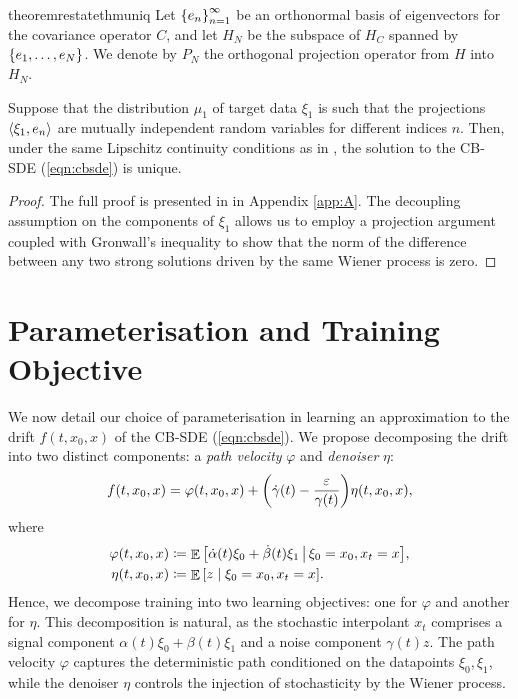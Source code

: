 \begin{restatable}{theorem}{restatethmuniq}\label{thm:uniq}
  Let \(\qty{e_{n}}_{n=1}^{\infty}\) be an orthonormal basis of eigenvectors for the covariance operator \(C\), and let \(H_{N}\) be the subspace of \(H_{C}\) spanned by \(\qty{e_{1}, \ldots, e_{N}}\). We denote by \(P_{N}\) the orthogonal projection operator from \(H\) into \(H_{N}\).

  Suppose that the distribution \(\mu_{1}\) of target data \(\xi_{1}\) is such that the projections \(\ev{\xi_{1}, e_{n}}\) are mutually independent random variables for different indices \(n\). Then, under the same Lipschitz continuity conditions as in , the solution to the CB-SDE (\ref{eqn:cbsde}) is unique.
\end{restatable}
\begin{proof}
  The full proof is presented in  in Appendix \ref{app:A}. The decoupling assumption on the components of \(\xi_{1}\) allows us to employ a projection argument coupled with Gronwall's inequality to show that the norm of the difference between any two strong solutions driven by the same Wiener process is zero.
\end{proof}


\section{Parameterisation and Training Objective}
We now detail our choice of parameterisation in learning an approximation to the drift \(f(t,x_{0}, x)\)  of the CB-SDE (\ref{eqn:cbsde}). We propose decomposing the drift into two distinct components: a \textit{path velocity} \(\varphi\) and \textit{denoiser} \(\eta\):
\begin{equation}
  f(t, x_{0}, x) = \varphi(t, x_{0}, x) + \qty(\dot{\gamma}(t) - \frac{\varepsilon}{\gamma(t)}) \eta(t,  x_{0}, x), \label{eqn:driftgoodparam}
\end{equation}
where
\begin{align*}
  \varphi(t, x_{0}, x) &\coloneqq \mathop{\mathbb{E}}\qty[\dot{\alpha}(t) \xi_{0} + \dot{\beta}(t)\xi_{1} \,\big|\, \xi_{0} = x_{0}, x_{t} = x], \\
  \eta(t, x_{0}, x) &\coloneqq \mathop{\mathbb{E}}\qty[z \mid \xi_{0} = x_{0}, x_{t} = x].
\end{align*}
Hence, we decompose training into two learning objectives: one for \(\varphi\) and another for \(\eta\). This decomposition is natural, as the stochastic interpolant \(x_{t}\) comprises a  signal component \(\alpha(t) \xi_{0} + \beta(t) \xi_{1}\) and a noise component \(\gamma(t) z\). The path velocity \(\varphi\) captures the deterministic path conditioned on the datapoints \(\xi_{0}, \xi_{1}\), while the denoiser \(\eta\) controls the injection of stochasticity by the Wiener process. %

